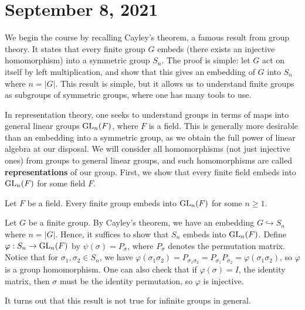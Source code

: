 \section{September 8, 2021}

We begin the course by recalling Cayley's theorem, a famous result from group theory. It states that 
every finite group $G$ embeds (there exists an injective homomorphism) into a symmetric group $S_n$. 
The proof is simple: let $G$ act on itself by left multiplication, and show that this gives an 
embedding of $G$ into $S_n$ where $n = |G|$. This result is simple, but it allows us to understand 
finite groups as subgroups of symmetric groups, where one has many tools to use. 

In representation theory, one seeks to understand groups in terms of maps into general linear groups 
$\operatorname{GL}_n(F)$, where $F$ is a field. This is generally more desirable than an embedding into 
a symmetric group, as we obtain the full power of linear algebra at our disposal. We will consider 
all homomorphisms (not just injective ones) from groups to general linear groups, and such 
homomorphisms are called {\bf representations} of our group. First, we show that 
every finite field embeds into $\operatorname{GL}_n(F)$ for some field $F$.

\begin{prop}{}
Let $F$ be a field. Every finite group embeds into $\operatorname{GL}_n(F)$ for some $n \geq 1$. 
\end{prop}
\begin{pf}
Let $G$ be a finite group. By Cayley's theorem, we have an embedding $G \hookrightarrow S_n$ 
where $n = |G|$. Hence, it suffices to show that $S_n$ embeds into $\operatorname{GL}_n(F)$. Define 
$\varphi : S_n \to \operatorname{GL}_n(F)$ by $\psi(\sigma) = P_\sigma$, where $P_\sigma$ denotes the permutation matrix. Notice that for $\sigma_1, \sigma_2 \in S_n$, we have $\varphi(\sigma_1\sigma_2) 
= P_{\sigma_1\sigma_2} = P_{\sigma_1}P_{\sigma_2} = \varphi(\sigma_1\sigma_2)$, so $\varphi$ is a 
group homomorphism. One can also check that if $\varphi(\sigma) = I$, the identity matrix, then 
$\sigma$ must be the identity permutation, so $\varphi$ is injective.
\end{pf}

It turns out that this result is not true for infinite groups in general. 

